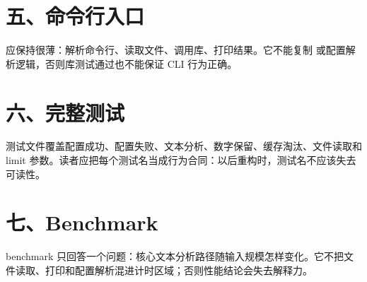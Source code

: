 

\section{五、命令行入口}

 应保持很薄：解析命令行、读取文件、调用库、打印结果。它不能复制  或配置解析逻辑，否则库测试通过也不能保证 CLI 行为正确。



\section{六、完整测试}

测试文件覆盖配置成功、配置失败、文本分析、数字保留、缓存淘汰、文件读取和 limit 参数。读者应把每个测试名当成行为合同：以后重构时，测试名不应该失去可读性。



\section{七、Benchmark}

benchmark 只回答一个问题：核心文本分析路径随输入规模怎样变化。它不把文件读取、打印和配置解析混进计时区域；否则性能结论会失去解释力。


